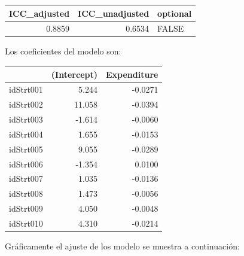 \documentclass[
  spanish,
  12pt,
]{book}
\newenvironment{Shaded}{\begin{snugshade}}{\end{snugshade}}
\newcommand{\DataTypeTok}[1]{\textcolor[rgb]{0.13,0.29,0.53}{#1}}
\newcommand{\DecValTok}[1]{\textcolor[rgb]{0.00,0.00,0.81}{#1}}
\newcommand{\FunctionTok}[1]{\textcolor[rgb]{0.13,0.29,0.53}{\textbf{#1}}}
\newcommand{\NormalTok}[1]{#1}
\newcommand{\SpecialCharTok}[1]{\textcolor[rgb]{0.81,0.36,0.00}{\textbf{#1}}}
\begin{document}
\begin{tabular}{r|r|l}
\hline
ICC\_adjusted & ICC\_unadjusted & optional\\
\hline
0.8859 & 0.6534 & FALSE\\
\hline
\end{tabular}

Los coeficientes del modelo son:

\begin{Shaded}
\end{Shaded}

\begin{tabular}{l|r|r}
\hline
  & (Intercept) & Expenditure\\
\hline
idStrt001 & 5.244 & -0.0271\\
\hline
idStrt002 & 11.058 & -0.0394\\
\hline
idStrt003 & -1.614 & -0.0060\\
\hline
idStrt004 & 1.655 & -0.0153\\
\hline
idStrt005 & 9.055 & -0.0289\\
\hline
idStrt006 & -1.354 & 0.0100\\
\hline
idStrt007 & 1.035 & -0.0136\\
\hline
idStrt008 & 1.473 & -0.0056\\
\hline
idStrt009 & 4.050 & -0.0048\\
\hline
idStrt010 & 4.310 & -0.0214\\
\hline
\end{tabular}

Gráficamente el ajuste de los modelo se muestra a continuación:
\end{document}
